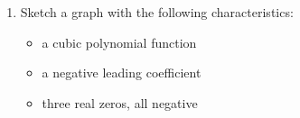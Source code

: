\documentclass[12pt, oneside]{article}
\begin{document}
\begin{enumerate}
\item Sketch a graph with the following characteristics: 
\begin{itemize}
\item a cubic polynomial function
\item a negative leading coefficient
\item three real zeros, all negative
\end{itemize}
\begin{center}
\end{center}



\end{enumerate}
\end{document}
